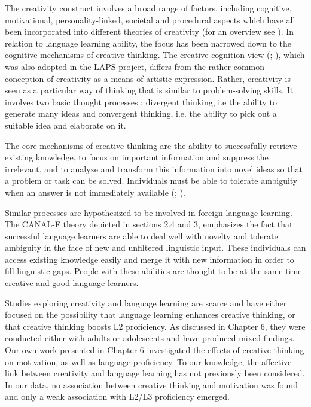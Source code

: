 \documentclass[output=paper]{langscibook}
\begin{document}
The creativity construct involves a broad range of factors, including cognitive, motivational, personality-linked, societal and procedural aspects which have all been incorporated into different theories of creativity (for an overview see \citealt{Lubart1994}). In relation to language learning ability, the focus has been narrowed down to the cognitive mechanisms of creative thinking. The creative cognition view (\citealt{FinkeEtAl1992}; \citealt{Cropley2006}), which was also adopted in the LAPS project, differs from the rather common conception of creativity as a means of artistic expression. Rather, creativity is seen as a particular way of thinking that is similar to problem-solving skills. It involves two basic thought processes \citep{Guilford1950}: divergent thinking, i.e the ability to generate many ideas and convergent thinking, i.e. the ability to pick out a suitable idea and elaborate on it.

The core mechanisms of creative thinking are the ability to successfully retrieve existing knowledge, to focus on important information and suppress the irrelevant, and to analyze and transform this information into novel ideas so that a problem or task can be solved. Individuals must be able to tolerate ambiguity when an answer is not immediately available (\citealt{Guilford1950}; \citealt{FinkeEtAl1992}). 

Similar processes are hypothesized to be involved in foreign language learning. The CANAL-F theory \citep{GrigorenkoEtAl2000} depicted in sections 2.4 and 3, emphasizes the fact that successful language learners are able to deal well with novelty and tolerate ambiguity in the face of new and unfiltered linguistic input. These individuals can access existing knowledge easily and merge it with new information in order to fill linguistic gaps. People with these abilities are thought to be at the same time creative and good language learners. 

Studies exploring creativity and language learning are scarce and have either focused on the possibility that language learning enhances creative thinking, or that creative thinking boosts L2 proficiency. As discussed in Chapter 6, they were conducted either with adults or adolescents and have produced mixed findings. Our own work presented in Chapter 6 investigated the effects of creative thinking on motivation, as well as language proficiency. To our knowledge, the affective link between creativity and language learning has not previously been considered. In our data, no association between creative thinking and motivation was found and only a weak association with L2/L3 proficiency emerged.
\end{document}
